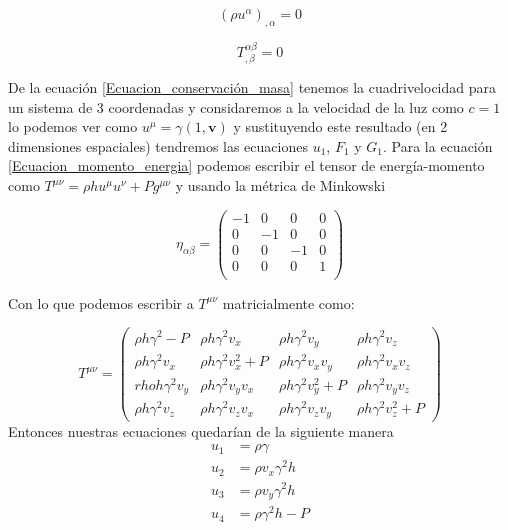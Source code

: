 \documentclass[12pt,a4paper]{book}
\begin{document}
\begin{equation}\label{Ecuacion_conservación_masa}
\left( \rho u^{\alpha} \right)_{, \alpha} =0
\end{equation}

\begin{equation}\label{Ecuacion_momento_energia}
T_{, \beta}^{\alpha \beta}=0
\end{equation}

De la ecuación \ref{Ecuacion_conservación_masa} tenemos la cuadrivelocidad para un sistema de 3 coordenadas y considaremos a la velocidad de la luz como $c=1$ lo podemos ver como $u^{\mu}=\gamma \left( 1, \textbf{v}\right)$ y sustituyendo este resultado (en 2 dimensiones espaciales) tendremos las ecuaciones $u_1$, $F_1$ y $G_1$. Para la ecuación \ref{Ecuacion_momento_energia} podemos escribir el tensor de energía-momento como $T^{\mu \nu} = \rho h u^{\mu} u^{\nu} + Pg^{\mu \nu}$ y usando la métrica de Minkowski

\begin{equation}
\eta_{\alpha \beta}= 
\begin{pmatrix}
 -1 & 0 & 0 & 0 \\
 0 & -1 & 0 & 0 \\
 0 & 0 & -1 & 0 \\
 0 & 0 & 0 & 1 \\
\end{pmatrix}
\end{equation}

Con lo que podemos escribir a $T^{\mu \nu}$ matricialmente como:

\begin{equation}
T^{\mu \nu} =
\begin{pmatrix}
\rho h \gamma^2-P & \rho h \gamma^2 v_{x}  & \rho h \gamma^2 v_{y} & \rho h \gamma^2 v_{z} \\

\rho h \gamma^2 v_{x} & \rho h \gamma^2 v_{x}^{2}+P & \rho h \gamma^2 v_{x}v_{y} &  \rho h \gamma^2 v_{x}v_{z} \\

rho h \gamma^2 v_{y} & \rho h \gamma^2 v_{y}v_{x} & \rho h \gamma^2 v_{y}^{2}+P & \rho h \gamma^2 v_{y}v_{z}\\

\rho h \gamma^2 v_{z} & \rho h \gamma^2 v_{z}v_{x} & \rho h \gamma^2 v_{z}v_{y} & \rho h \gamma^2 v_{z}^2 + P

\end{pmatrix}
\end{equation}
Entonces nuestras ecuaciones quedarían de la siguiente manera
\begin{align}
u_{1}& = \rho \gamma \\ 
u_{2}& = \rho v_{x} \gamma^{2} h \\ 
u_{3}& = \rho v_{y} \gamma^{2} h \\ 
u_{4}& = \rho \gamma^{2} h - P 
\end{align}
\end{document}
